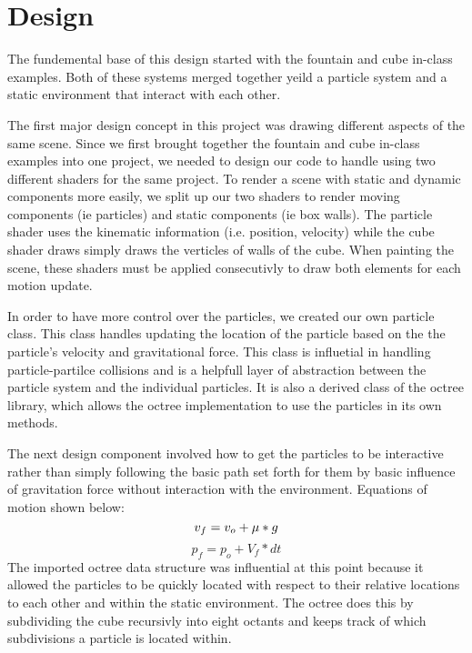 \section{Design}


The fundemental base of this design started with the fountain and cube in-class examples.  Both of these
systems merged together yeild a particle system and a static environment that interact with each other.

The first major design concept in this project was drawing different aspects
of the same scene. Since we first brought together the fountain and cube
in-class examples into one project, we needed to design our code to handle
using two different shaders for the same project. To render a scene with static
and dynamic components more easily, we split up our two shaders to render 
moving components (ie particles) and static components (ie box walls). 
The particle shader uses the kinematic information (i.e. position, velocity) 
while the cube shader draws simply draws the verticles of walls
of the cube.  When painting the scene, these shaders must be applied consecutivly 
to draw both elements for each motion update.


In order to have more control over the particles, we created our own particle class.
This class handles updating the location of the particle based on the the particle's
velocity and gravitational force.  This class is influetial in handling particle-partilce
collisions and is a helpfull layer of abstraction between the particle system and the
individual particles. It is also a derived class of the octree library, which allows
the octree implementation to use the particles in its own methods. 

The next design component involved how to get the particles to be interactive rather than simply 
following the basic path set forth for them by basic influence of gravitation force without interaction
with the environment. Equations of motion shown below:
\begin{equation*}
  v_{f} = v_{o}  +\mu*g \\ 
\end{equation*}
\begin{equation*}
  p_{f} = p_{o} +V_{f}*dt
\end{equation*}
The imported octree data structure was influential at this point because it
allowed the particles to be quickly located with respect to their relative locations to each
other and within the static environment. The octree does this by subdividing the cube recursivly
into eight octants and keeps track of which subdivisions a particle is located within.

